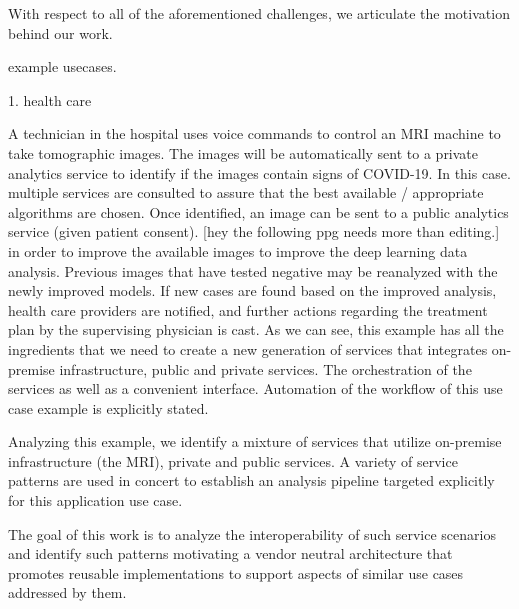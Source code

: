 With respect to all of the aforementioned challenges, we articulate 
the motivation behind our work. 

example usecases. 

1. health care

A technician in the hospital uses voice commands to control an MRI
machine to take tomographic images. The images will be automatically
sent to a private analytics service to identify if the images contain
signs of COVID-19. In this case. multiple services are consulted to 
assure that the best available / appropriate algorithms are chosen. 
Once identified, an image can be sent to a public analytics service (given patient consent).
[hey the following ppg needs more than editing.]
in
order to improve the available images to improve the deep learning data
analysis. Previous images that have tested negative may be reanalyzed
with the newly improved models. If new cases are found based on
the improved analysis, health care providers are notified, and further
actions regarding the treatment plan by the supervising physician is
cast. As we can see, this example has all the ingredients that we need
to create a new generation of services that integrates on-premise
infrastructure, public and private services. The orchestration of the
services as well as a convenient interface. Automation of the workflow
of this use case example is explicitly stated.

Analyzing this example, we identify a mixture of services that utilize
on-premise infrastructure (the MRI), private and public services. A
variety of service patterns are used in concert to establish an analysis
pipeline targeted explicitly for this application use case. 

The goal of this work is to analyze the interoperability of such
service scenarios and identify such patterns motivating a vendor
neutral architecture that promotes reusable implementations to 
support aspects of similar use cases addressed by them.

